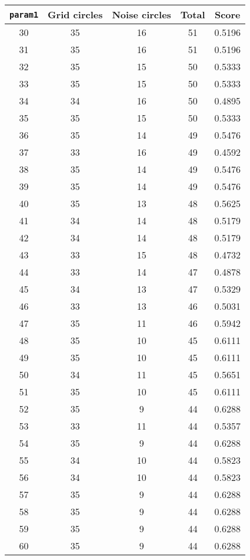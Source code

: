 \documentclass[letterpaper, 12pt]{article}
\begin{document}
\begin{longtable}{|c|c|c|c|c|}
\hline
\textbf{\texttt{param1}} & \textbf{Grid circles} & \textbf{Noise circles} & \textbf{Total} & \textbf{Score} \\
\hline
30 & 35 & 16 & 51 & 0.5196 \\
\hline
31 & 35 & 16 & 51 & 0.5196 \\
\hline
32 & 35 & 15 & 50 & 0.5333 \\
\hline
33 & 35 & 15 & 50 & 0.5333 \\
\hline
34 & 34 & 16 & 50 & 0.4895 \\
\hline
35 & 35 & 15 & 50 & 0.5333 \\
\hline
36 & 35 & 14 & 49 & 0.5476 \\
\hline
37 & 33 & 16 & 49 & 0.4592 \\
\hline
38 & 35 & 14 & 49 & 0.5476 \\
\hline
39 & 35 & 14 & 49 & 0.5476 \\
\hline
40 & 35 & 13 & 48 & 0.5625 \\
\hline
41 & 34 & 14 & 48 & 0.5179 \\
\hline
42 & 34 & 14 & 48 & 0.5179 \\
\hline
43 & 33 & 15 & 48 & 0.4732 \\
\hline
44 & 33 & 14 & 47 & 0.4878 \\
\hline
45 & 34 & 13 & 47 & 0.5329 \\
\hline
46 & 33 & 13 & 46 & 0.5031 \\
\hline
47 & 35 & 11 & 46 & 0.5942 \\
\hline
48 & 35 & 10 & 45 & 0.6111 \\
\hline
49 & 35 & 10 & 45 & 0.6111 \\
\hline
50 & 34 & 11 & 45 & 0.5651 \\
\hline
51 & 35 & 10 & 45 & 0.6111 \\
\hline
52 & 35 & 9 & 44 & 0.6288 \\
\hline
53 & 33 & 11 & 44 & 0.5357 \\
\hline
54 & 35 & 9 & 44 & 0.6288 \\
\hline
55 & 34 & 10 & 44 & 0.5823 \\
\hline
56 & 34 & 10 & 44 & 0.5823 \\
\hline
57 & 35 & 9 & 44 & 0.6288 \\
\hline
58 & 35 & 9 & 44 & 0.6288 \\
\hline
59 & 35 & 9 & 44 & 0.6288 \\
\hline
60 & 35 & 9 & 44 & 0.6288 \\

\end{longtable}
\end{document}
